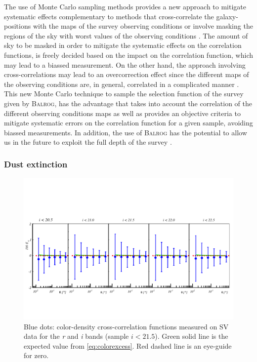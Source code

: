      The use of Monte Carlo sampling methods provides a new approach to mitigate systematic effects complementary to methods that cross-correlate the galaxy-positions with the maps of the survey observing conditions \cite{2012MNRAS.424..564R,2012ApJ...761...14H,2015MNRAS.454.3121M} or involve masking the regions of the sky with worst values of the observing conditions \cite{2016MNRAS.455.4301C}. The amount of sky to be masked in order to mitigate the systematic effects on the correlation functions, is freely decided based on the impact on the correlation function, which may lead to a biassed measurement. On the other hand, the approach involving cross-correlations may lead to an overcorrection effect since the different maps of the observing conditions are, in general, correlated in a complicated manner \cite{2016MNRAS.456.2095E}. This new Monte Carlo technique to sample the selection function of the survey given by {\scshape Balrog}, has the advantage that takes into account the correlation of the different observing conditions maps as well as provides an objective criteria to mitigate systematic errors on the correlation function for a given sample, avoiding biassed measurements. In addition, the use of {\scshape Balrog} has the potential to allow us in the future to exploit the full depth of the survey \cite{2016MNRAS.457..786S}.

\subsubsection{Dust extinction}
\label{sec:dustext}

\begin{figure}
\includegraphics[width=\textwidth,trim={0 2.3cm 0 3.5cm},clip]{./figures/mag_i_ri.pdf}
\caption{Blue dots: color-density cross-correlation functions measured on SV data for the {\it r} and {\it i} bands (sample $i<21.5$). Green solid line is the expected value from \autoref{eq:colorexcess}. Red dashed line is an eye-guide for zero.}
\label{fig:colorexcess}
\end{figure}

